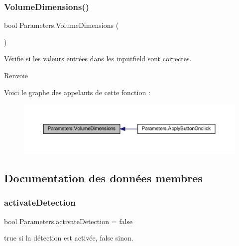 \subsubsection{\texorpdfstring{Volume\+Dimensions()}{VolumeDimensions()}}
{\footnotesize\ttfamily bool Parameters.\+Volume\+Dimensions (\begin{DoxyParamCaption}{ }\end{DoxyParamCaption})\hspace{0.3cm}{\ttfamily [inline]}}



Vérifie si les valeurs entrées dans les inputfield sont correctes. 

\begin{DoxyReturn}{Renvoie}

\end{DoxyReturn}
Voici le graphe des appelants de cette fonction \+:
\nopagebreak
\begin{figure}[H]
\begin{center}
\leavevmode
\includegraphics[width=350pt]{class_parameters_a92f68fa9992b1066153a6175dd37dc36_icgraph}
\end{center}
\end{figure}


\subsection{Documentation des données membres}
\mbox{\label{class_parameters_ada09985fa2537e0d28f616e0d9b86fb4}} 
\subsubsection{\texorpdfstring{activate\+Detection}{activateDetection}}
{\footnotesize\ttfamily bool Parameters.\+activate\+Detection = false\hspace{0.3cm}{\ttfamily [private]}}



true si la détection est activée, false sinon. 

